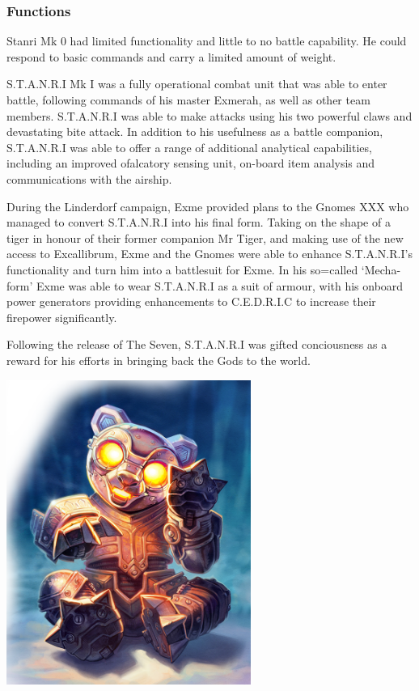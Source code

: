 \subsubsection{Functions}

Stanri Mk 0 had limited functionality and little to no battle capability.  He could respond to basic commands and carry a limited amount of weight.     

S.T.A.N.R.I Mk I was a fully operational combat unit that was able to enter battle, following commands of his master Exmerah, as well as other team members.  S.T.A.N.R.I was able to make attacks using his two powerful claws and devastating bite attack.  In addition to his usefulness as a battle companion, S.T.A.N.R.I  was able to offer a range of additional analytical capabilities, including an improved ofalcatory sensing unit, on-board item analysis and communications with the airship.  

During the Linderdorf campaign, Exme provided plans to the Gnomes XXX who managed to convert S.T.A.N.R.I into his final form.  Taking on the shape of a tiger in honour of their former companion Mr Tiger, and making use of the new access to Excallibrum, Exme and the Gnomes were able to enhance S.T.A.N.R.I's functionality and turn him into a battlesuit for Exme.  In his so=called `Mecha-form' Exme was able to wear S.T.A.N.R.I as a suit of armour, with his onboard power generators providing enhancements to C.E.D.R.I.C to increase their firepower significantly.

Following the release of The Seven, S.T.A.N.R.I was gifted conciousness as a reward for his efforts in bringing back the Gods to the world.  

\begin{center}
\includegraphics[width=80mm]{./content/img/babyStanri.png}
\begin{figure}[h]
\end{figure}
\end{center}


\clearpage